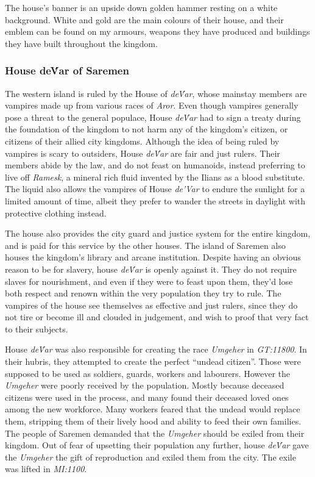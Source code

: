The house's banner is an upside down golden hammer resting on a white
background. White and gold are the main colours of their house, and their
emblem can be found on my armours, weapons they have produced and buildings
they have built throughout the kingdom.

\subsubsection*{House de\'Var of Saremen}
\label{sec:House deVar}

The western island is ruled by the House of \emph{de\'Var}, whose mainstay
members are vampires made up from various races of \emph{Aror}. Even though
vampires generally pose a threat to the general populace, House \emph{de\'Var}
had to sign a treaty during the foundation of the kingdom to not harm any of
the kingdom's citizen, or citizens of their allied city kingdoms. Although
the idea of being ruled by vampires is scary to outsiders, House \emph{de\'Var}
are fair and just rulers. Their members abide by the law, and do not feast on
humanoids, instead preferring to live off \emph{Ramesk}, a mineral rich fluid
invented by the Ilians as a blood substitute. The liquid also allows the
vampires of House \emph{de'Var} to endure the sunlight for a limited amount of
time, albeit they prefer to wander the streets in daylight with protective
clothing instead.

The house also provides the city guard and justice system for the entire
kingdom, and is paid for this service by the other houses. The island of
Saremen also houses the kingdom's library and arcane institution. Despite
having an obvious reason to be for slavery, house \emph{de\'Var} is openly
against it. They do not require slaves for nourishment, and even if they were
to feast upon them, they'd lose both respect and renown within the very
population they try to rule. The vampires of the house see themselves as
effective and just rulers, since they do not tire or become ill and clouded in
judgement, and wish to proof that very fact to their subjects.

House \emph{de\'Var} was also responsible for creating the race \emph{Umgeher}
in \emph{GT:11800}. In their hubris, they attempted to create the perfect
``undead citizen''. Those were supposed to be used as soldiers, guards,
workers and labourers. However the \emph{Umgeher} were poorly received by the
population. Mostly because deceased citizens were used in the process, and
many found their deceased loved ones among the new workforce. Many workers
feared that the undead would replace them, stripping them of their lively hood
and ability to feed their own families. The people of Saremen demanded that
the \emph{Umgeher} should be exiled from their kingdom. Out of fear of
upsetting their population any further, house \emph{de\'Var} gave the
\emph{Umgeher} the gift of reproduction and exiled them from the city. The
exile was lifted in \emph{MI:1100}.

